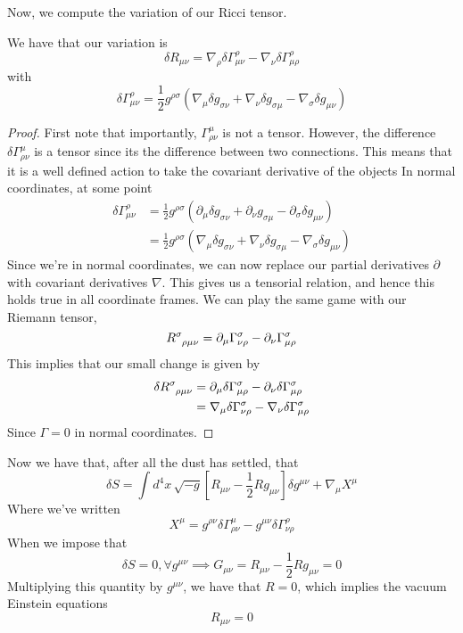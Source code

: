 Now, we compute the variation of our Ricci tensor. 
\begin{claim}
	We have that our variation is 
	\[
	 \delta R_{ \mu \nu } = \nabla _ \rho \delta \Gamma ^ \rho _{ \mu \nu } - \nabla_{ \nu  }
	 \delta \Gamma ^ \rho _{ \mu \rho }
	\]  with 
	\[
	 \delta \Gamma ^ \rho _{ \mu \nu } = \frac{1}{2 } 
	 g ^{ \rho \sigma } ( \nabla _ \mu \delta g _{ \sigma \nu } + 
	 \nabla _ \nu \delta g _{ \sigma \mu } - \nabla _ \sigma \delta g_{ \mu \nu } ) 
	\] 
\begin{proof}
	First note that importantly, $ \Gamma ^ \mu _{ \rho \nu } $ is not a tensor. 
	However, the difference $ \delta \Gamma ^ \mu _{ \rho \nu } $ 
	is a tensor since its the difference between two connections. This means that it is a well defined action 
	to take the covariant derivative of the objects
	In normal coordinates, at some point 
	\begin{align*}
		\delta \Gamma^ \rho _{ \mu \nu } &= \frac{1}{2 }  g ^{ \rho  \sigma }\left( 
		\partial  _ \mu \delta g _{ \sigma \nu } + \partial  _ \nu 
	g _{ \sigma \mu } - \partial  _ \sigma \delta g _{ \mu \nu } \right)   \\
						 &=  \frac{1}{2 } g ^{ \rho\sigma } \left(  
						 \nabla _ \mu \delta g _{ \sigma \nu } 
					 + \nabla _ \nu \delta g _{ \sigma \mu } 
				  - \nabla _{ \sigma } \delta g _{ \mu \nu }\right)  
	\end{align*}
	Since we're in normal coordinates, we can now replace our partial 
	derivatives $ \partial $ with covariant derivatives $ \nabla $. 
	This gives us a tensorial relation, and hence this 
	holds true in all coordinate frames. We can play the same 
	game with our Riemann tensor, 
	\[
	 R \indices{ ^ \sigma _{ \rho \mu \nu } }  = \partial  _ \mu \Gamma ^ \sigma _{ \nu \rho } 
	  - \partial  _ \nu \Gamma ^ \sigma _{ \mu \rho }
	\]  This implies that our small change 
	is given by 
	\begin{align*}
		\delta R \indices{ ^ \sigma _{ \rho \mu \nu } } &=  \partial  _ \mu  
		\delta \Gamma ^ \sigma _{ \mu \rho }  - \partial  _ \nu \delta \Gamma 
		^ \sigma _{ \mu \rho }\\
		&=  \nabla _ \mu \delta \Gamma ^ \sigma _{ \nu \rho } - 
		\nabla _ \nu \delta \Gamma ^ \sigma _{ \mu \rho } \\
	\end{align*} Since $ \Gamma  =0 $ in normal coordinates.  
\end{proof}
\end{claim}

Now we have that, after all the dust has settled, 
that 
\[
 \delta S = \int d ^ 4 x \, \sqrt{ - g }  \left[  
 R _{ \mu \nu }  - \frac{1}{2 } R g _{ \mu \nu } \right] \delta g ^{ \mu \nu } + \nabla _ \mu X ^ \mu  
\] Where we've written 
\[
 X ^ \mu = g ^{ \rho \nu } \delta \Gamma ^ \mu _{ \rho \nu }  - g ^{ \mu \nu } \delta \Gamma ^ \rho _{ \nu \rho }
\] When we impose that 
\[
 \delta S = 0 , \forall g ^{ \mu \nu } \implies 
 G _{ \mu \nu } = R _{ \mu \nu } - \frac{1}{2 } R g _{ \mu \nu } =0 
\] Multiplying this quantity by $ g ^{ \mu \nu } $, we have that 
$ R = 0 $, which implies the vacuum Einstein equations 
\[
 R_{ \mu \nu } = 0 
\]

